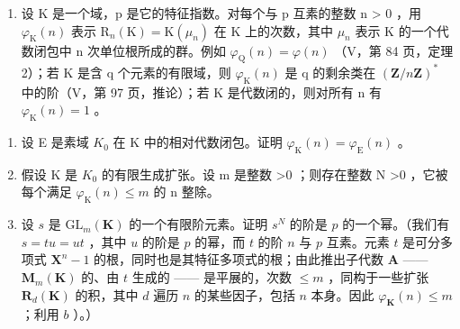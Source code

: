 \begin{enumerate}
\def\labelenumi{\arabic{enumi})}
\setcounter{enumi}{4}
\tightlist
\item
  设 K 是一个域，p 是它的特征指数。对每个与 p 互素的整数 n \textgreater{} 0 ，用 \(\varphi_{\mathrm{K}}(n)\) 表示 \(\mathrm{R}_{n}(\mathrm{K}) = \mathrm{K}(\mu_{n})\) 在 K 上的次数，其中 \(\mu_{n}\) 表示 K 的一个代数闭包中 n 次单位根所成的群。例如 \(\varphi_{\mathrm{Q}}(n) = \varphi(n)\) （V，第 84 页，定理 2）；若 K 是含 q 个元素的有限域，则 \(\varphi_{\mathrm{K}}(n)\) 是 q 的剩余类在 \((\mathbf{Z}/n\mathbf{Z})^{*}\) 中的阶（V，第 97 页，推论）；若 K 是代数闭的，则对所有 n 有 \(\varphi_{\mathrm{K}}(n) = 1\) 。
\end{enumerate}

\begin{enumerate}
\def\labelenumi{\alph{enumi})}
\item
  设 E 是素域 \(K_{0}\) 在 K 中的相对代数闭包。证明 \(\varphi_{\mathrm{K}}(n) = \varphi_{\mathrm{E}}(n)\) 。
\item
  假设 K 是 \(K_{0}\) 的有限生成扩张。设 m 是整数 \textgreater0 ；则存在整数 N \textgreater0 ，它被每个满足 \(\varphi_{\mathrm{K}}(n) \leqslant m\) 的 n 整除。
\item
  设 \(s\) 是 \(\mathrm{GL}_m(\mathbf{K})\) 的一个有限阶元素。证明 \(s^N\) 的阶是 \(p\) 的一个幂。（我们有 \(s = tu = ut\) ，其中 \(u\) 的阶是 \(p\) 的幂，而 \(t\) 的阶 \(n\) 与 \(p\) 互素。元素 \(t\) 是可分多项式 \(\mathbf{X}^n - 1\) 的根，同时也是其特征多项式的根；由此推出子代数 \(\mathbf{A}\) —— \(\mathbf{M}_m(\mathbf{K})\) 的、由 \(t\) 生成的 —— 是平展的，次数 \(\leqslant m\) ，同构于一些扩张 \(\mathbf{R}_d(\mathbf{K})\) 的积，其中 \(d\) 遍历 \(n\) 的某些因子，包括 \(n\) 本身。因此 \(\varphi_{\mathbf{K}}(n) \leqslant m\) ；利用 \(b\) ）。）
\end{enumerate}
\relax{}
